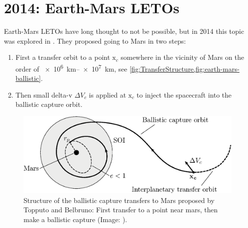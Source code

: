 \section{2014: Earth-Mars LETOs}
Earth-Mars LETOs have long thought to not be possible, but in 2014 this topic was explored in \cite{Topputo2014}. They proposed going to Mars in two steps:
\begin{enumerate}
	\item First a transfer orbit to a point $\mathrm{x}_c$ somewhere in the vicinity of Mars on the order of \SIrange{e6}{e7}{\km}, see \cref{fig:TransferStructure,fig:earth-mars-ballistic}.
	\item Then small delta-v $\Delta V_c$ is applied at $\mathrm{x}_c$ to inject the spacecraft into the ballistic capture orbit.
\end{enumerate}

\begin{figure}[ht]
    \centering
    \includegraphics[width=0.70\linewidth]{fig/TransferStructure.eps}
    \caption{Structure of the ballistic capture transfers to Mars proposed by Topputo and Belbruno: First transfer to a point near mars, then make a ballistic capture (Image: \cite{Topputo2014}).}
    \label{fig:TransferStructure}
\end{figure}

